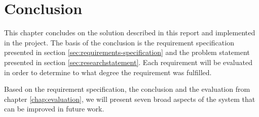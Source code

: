 \chapter{Conclusion}\label{chap:conclusion}

This chapter concludes on the solution described in this report and implemented in the project. The basis of the conclusion is the requirement specification presented in section \ref{sec:requirements-specification} and the problem statement presented in section \ref{sec:researchstatement}. Each requirement will be evaluated in order to determine to what degree the requirement was fulfilled.

Based on the requirement specification, the conclusion and the evaluation from chapter \ref{chap:evaluation}, we will present seven broad aspects of the system that can be improved in future work.



